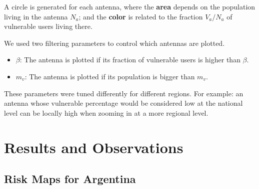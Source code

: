 	A circle is generated for each antenna, where
		the \textbf{area} depends on the population living in the antenna $N_a$;
		and the \textbf{color} is related to the fraction ${V_a}/{N_a}$ of vulnerable users living there.
    
    We used two filtering parameters to control which antennas are plotted.
    \begin{itemize}
        \item $\beta$: The antenna is plotted if its fraction of vulnerable users is higher than $\beta$.
        \item $m_v$: The antenna is plotted if its population is bigger than $m_v$.
    \end{itemize}
    
    These parameters were tuned differently for different regions. For example: an antenna whose vulnerable percentage would be considered low at the national level can be locally high when zooming in at a more regional level.
    


\section{Results and Observations} \label{results}

\subsection{Risk Maps for Argentina}


